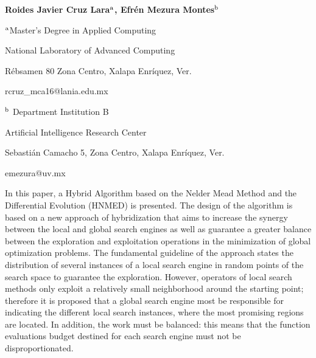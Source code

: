 \documentclass[a4paper,12pt]{article}
\begin{document}
\centerline{\bf }

\vspace{12pt}

\centerline{ \bf Roides Javier Cruz Lara$^{\rm a}$,  \bf Efr\'en Mezura Montes$^{\rm b}$}

\vspace{12pt}

\centerline{$^{\rm a}$Master's Degree in Applied Computing}
\centerline{National Laboratory of Advanced Computing}
\centerline{R\'ebsamen 80 Zona Centro, Xalapa Enr\'iquez, Ver.}
\centerline{rcruz\_mca16@lania.edu.mx}

\vspace{12pt}

\centerline{$^{\rm b}$ Department Institution B}
\centerline{Artificial Intelligence Research Center}
\centerline{Sebasti\'an Camacho 5, Zona Centro, Xalapa Enr\'iquez, Ver.}
\centerline{emezura@uv.mx}

\vspace{12pt}
\vspace{12pt}

In this paper, a Hybrid Algorithm based on the Nelder Mead Method and the Differential Evolution (HNMED) is presented. The design of the algorithm is based on a new approach of hybridization that aims to increase the synergy between the local and global search engines as well as guarantee a greater balance between the exploration and exploitation operations  in the minimization of global optimization problems. The fundamental guideline of the approach states the distribution of several instances of a local search engine in random points of the search space to guarantee the exploration. However, operators of local search methods only exploit a relatively small neighborhood around the starting point; therefore it is proposed that a global search engine most be responsible for indicating the different local search instances, where the most promising regions are located. In addition, the work must be balanced: this means that the function evaluations budget destined for each search engine must not be disproportionated. 
\end{document}
